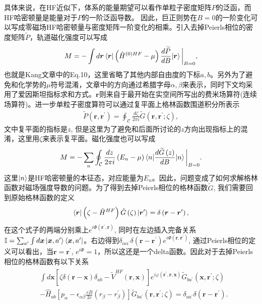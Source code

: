 \documentclass[10pt, oneside]{article}
\newcommand{\vph}{\varphi}
\newcommand{\pr}{\prime}
\newcommand{\p}[1]{\left(#1\right)}
\newcommand{\bb}[1]{\left[#1\right]}
\begin{document}
\vspace{1em}
具体来说，在HF近似下，体系的能量期望可以看作单粒子密度矩阵\(P\)的泛函，而HF哈密顿量是能量对于\(P\)的一阶泛函导数。 因此，巨正则势在\(B = 0\)的一阶变化可以写成零磁场HF哈密顿量与密度矩阵一阶变化的相乘。引入去掉Peierls相位的密度矩阵\(\widetilde{P}\)，轨道磁化强度可以写成
\begin{align}
    M = - \int d \bm{r} \braket{\bm{r} | \p{\hat{H}^{\p{0} HF}- \mu}  \frac{d \widetilde P}{ d B} | \bm{r}}\bigg|_{B = 0},
\end{align}
也就是Kang文章中的Eq.10，这里省略了其他内部自由度的下标\(a,b\)。另外为了避免和化学势的\(\mu\)符号混淆，文章中的方向通过希腊字母\(\alpha,\beta\)来表示，同时下文均采用了爱因斯坦指标求和方式。\(\bm{r}\)则来自于最开始在实空间所写出的费米场算符(连续场算符)。进一步单粒子密度算符可以通过复平面上格林函数围道积分所表示
\begin{align}
    \widetilde{P}\p{\bm{r},\bm{r}^\pr} = \oint_{\mathcal{C}} \frac{d \zeta}{ 2 \pi i} \widetilde{G}\p{\bm{r},\bm{r}^\pr; \zeta },
\end{align}
文中复平面的指标是\(z\), 但是这里为了避免和后面所讨论的\(z\)方向出现指标上的混淆，这里用\(\zeta\)来表示复平面。磁化强度也可以写成
\begin{align}
    M = -\sum_n \oint_{\mathcal{C}} \frac{d z}{ 2 \pi i} \p{E_n - \mu} \braket{n | \frac{d \widetilde{G} \p{z}}{dB} |n} \bigg|_{B = 0}.
\end{align}
这里\(\ket{n}\)是HF哈密顿量的本征态，对应能量为\(E_n\)。因此，问题变成了如何求解格林函数对磁场强度导数的问题。为了得到去掉Peierls相位的格林函数\(\widetilde{G}\), 我们需要回到原始格林函数的定义
\begin{align}
	\braket{\bm{r} | \p{\zeta - \hat{H}^{HF} } \hat{G} \p{\zeta} | \bm{r}^\pr } = \delta \p{\bm{r} - \bm{r}^\pr},
\end{align}
在这个式子的两端分别乘上\(e^{i \Phi \p{\bm{r}^\pr, \bm{r}}}\), 同时在左边插入完备关系 \(\mathbb{I} = \sum_{a^\pr} \int d\bm{x} \ket{\bm{x}, a^\pr} \bra{\bm{x}, a^\pr}\)。右边得到\(\delta_{\alpha \alpha^\pr} \delta \p{\bm{r} - \bm{r}^\pr} e^{i \Phi \p{\bm{r}, \bm{r}^\pr}}\), 通过Peierls相位的定义可以看出，当\(\bm{r} = \bm{r}^\pr\), \(e^{i \Phi} = 1\)，所以这还是一个delta函数。因此对于去掉Peierls相位的格林函数有以下关系
\begin{align}
	\begin{split}
		&\int d\bm{x} \bb{\zeta \delta \p{\bm{r} - \bm{x}} \delta_{ab} - \widetilde{V}^{HF} \p{\bm{r}, \bm{x}}} e^{i \vph \p{\bm{r}^\pr, \bm{r}, \bm{x}}} \widetilde{G}_{ba^\pr} \p{\bm{x},\bm{r}^\pr; \zeta}  \\
		&- \hat{H}_{ab} \bb{p_\alpha - \epsilon_{\alpha \beta} \frac{eB}{2 c} \p{r_{\beta} - r_{\beta}^\pr}} \widetilde{G}_{b a^\pr} \p{\bm{r},\bm{r}^\pr; \zeta} = \delta_{a a^\pr} \delta \p{\bm{r}-\bm{r}^\pr}.
	\end{split}
\end{align}
\end{document}
